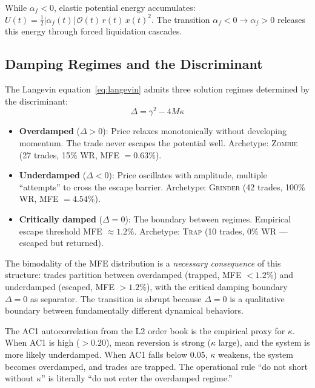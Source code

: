 \documentclass[11pt,a4paper]{article}
\newcommand{\af}{\alpha_f}
\newcommand{\OI}{\mathcal{O}}
\begin{document}
While $\af < 0$, elastic potential energy accumulates: $U(t) = \frac{1}{2}|\af(t)|\,\OI(t)\,r(t)\,x(t)^2$. The transition $\af < 0 \to \af > 0$ releases this energy through forced liquidation cascades.

\subsection{Damping Regimes and the Discriminant}
\label{sec:damping}

The Langevin equation~\eqref{eq:langevin} admits three solution regimes determined by the discriminant:
\begin{equation}
\Delta = \gamma^2 - 4M\kappa
\end{equation}

\begin{tcolorbox}[defbox, title=Three Damping Regimes $\to$ Trade Archetypes]
\begin{itemize}[leftmargin=1.5em]
\item \textbf{Overdamped} ($\Delta > 0$): Price relaxes monotonically without developing momentum. The trade never escapes the potential well. Archetype: \textsc{Zombie} (27 trades, 15\% WR, MFE $= 0.63\%$).
\item \textbf{Underdamped} ($\Delta < 0$): Price oscillates with amplitude, multiple ``attempts'' to cross the escape barrier. Archetype: \textsc{Grinder} (42 trades, 100\% WR, MFE $= 4.54\%$).
\item \textbf{Critically damped} ($\Delta = 0$): The boundary between regimes. Empirical escape threshold MFE $\approx 1.2\%$. Archetype: \textsc{Trap} (10 trades, 0\% WR --- escaped but returned).
\end{itemize}
\end{tcolorbox}

The bimodality of the MFE distribution is a \emph{necessary consequence} of this structure: trades partition between overdamped (trapped, MFE $< 1.2\%$) and underdamped (escaped, MFE $> 1.2\%$), with the critical damping boundary $\Delta = 0$ as separator. The transition is abrupt because $\Delta = 0$ is a qualitative boundary between fundamentally different dynamical behaviors.

The AC1 autocorrelation from the L2 order book is the empirical proxy for $\kappa$. When AC1 is high ($> 0.20$), mean reversion is strong ($\kappa$ large), and the system is more likely underdamped. When AC1 falls below 0.05, $\kappa$ weakens, the system becomes overdamped, and trades are trapped. The operational rule ``do not short without $\kappa$'' is literally ``do not enter the overdamped regime.''
\end{document}

